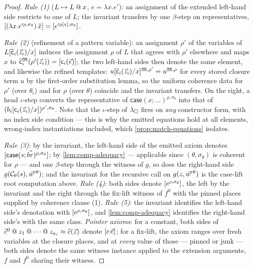 \begin{proof}
\emph{Rule (1)} ($L \mapsto L \mathbin{@} x$, $e = \lambda x.e'$): an
assignment of the extended left-hand side restricts to one of $L$; the
invariant transfers by one $\beta$-step on representatives,
$[(\lambda x.e'^{\rho,\sigma_\theta})\,\hat{x}] =
[e'^{\rho[x],\sigma_\theta}]$.

\emph{Rule (2)} (refinement of a pattern variable): an assignment
$\rho'$ of the variables of
$L[\widehat{\mathsf{c}}_i(\vec{z}_i)/x]$ induces the assignment
$\rho$ of $L$ that agrees with $\rho'$ elsewhere and maps $x$ to
$\widehat{\mathsf{c}}_i^{\mathfrak{M}}(\rho'(\vec{z}_i)) =
[\mathsf{c}_i(\vec{e})]$; the two left-hand sides then denote the
same element, and likewise the refined templates: $u[\widehat{\mathsf{c}}_i(\vec{z}_i)/x]^{\mathfrak{M},\rho'} = u^{\mathfrak{M},\rho}$ for every
stored closure term $u$ by the first-order substitution lemma, so the
uniform coherence data for $\rho'$ (over $\theta_i$) and for $\rho$
(over $\theta$) coincide and the invariant transfers.  On the right, a
head $\iota$-step converts the representative of
$\mathsf{case}(x;\dots)^{\rho,\sigma_\theta}$ into that of
$(b_i[\mathsf{c}_i(\vec{z}_i)/x])^{\rho',
\sigma_\theta}$.  Note that the $\iota$-step of $\lambda_{\square}$ fires on
\emph{any} constructor form, with no index side condition --- this is
why the emitted equations hold at all elements, wrong-index
instantiations included, which \cref{prop:match-equations} isolates.

\emph{Rule (3)}: by the invariant, the left-hand side of the emitted
axiom denotes $[\mathsf{case}(s;\vec{br})^{\rho,\sigma_\theta}]$;
by \cref{lem:comp-adequacy} --- applicable since $(\theta,
\sigma_\theta)$ is coherent for $\rho$ --- and one $\beta$-step
through the witness of $g$, so does the right-hand side
$g(\mathcal{C}_\theta(s), \vec{w}'{}^{\theta})$; and the invariant for
the recursive call on $g(z, \vec{w}'{}^{\theta})$ is the
case-lift root computation above.  \emph{Rule (4)}: both sides denote
$[e^{\rho,\sigma_\theta}]$, the left by the invariant and the
right through the fix-lift witness of $f^0$ with the pinned places
supplied by coherence clause (1).  \emph{Rule (5)}: the invariant
identifies the left-hand side's denotation with
$[e^{\rho,\sigma_\theta}]$, and \cref{lem:comp-adequacy}
identifies the right-hand side's with the same class.  \emph{Pointer
axioms}: for a constant, both sides of $\widehat{c}^0 \mathbin{@} z_1 \mathbin{@}
\cdots \mathbin{@} z_{a_c} \approx \widehat{c}(\vec{z})$ denote
$[c\,\vec{e}]$; for a fix-lift, the axiom ranges over fresh
variables at the closure places, and at \emph{every} value of those
--- pinned or junk --- both sides denote the same witness instance
applied to the extension arguments, $f$ and $f^0$ sharing their
witness.
\end{proof}

